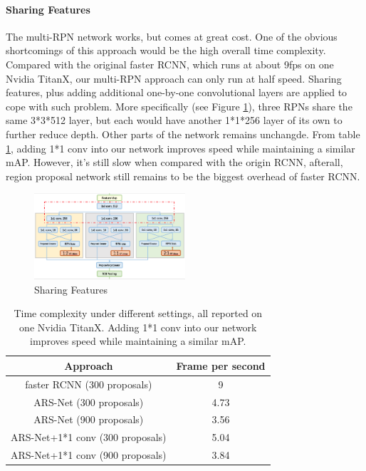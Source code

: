 \documentclass[10pt,twocolumn,letterpaper]{article}
\begin{document}
\paragraph{Sharing Features}
The multi-RPN network works, but comes at great cost. One of the obvious shortcomings of this approach would be the high overall time complexity. Compared with the original faster RCNN, which runs at about 9fps on one Nvidia TitanX, our multi-RPN approach can only run at half speed. Sharing features, plus adding additional one-by-one convolutional layers are applied to cope with such problem. More specifically (see Figure \ref{ARS_sh}), three RPNs share the same 3*3*512 layer, but each would have another 1*1*256 layer of its own to further reduce depth. Other parts of the network remains unchangde. From table \ref{table_fps}, adding 1*1 conv into our network improves speed while maintaining a similar mAP. However, it's still slow when compared with the origin RCNN, afterall, region proposal network still remains to be the biggest overhead of faster RCNN.
    \begin{figure}[!htb]
    \includegraphics[width= 0.5\textwidth]{pic/ARS-archi-share.png}
    \caption{Sharing Features}
    \label{ARS_sh}
    \end{figure}

\begin{table}[ht]
\centering
\begin{tabular}{|c|c|}
\hline Approach & Frame per second \\
\hline faster RCNN (300 proposals) & 9 \\
\hline ARS-Net (300 proposals) & 4.73 \\
\hline ARS-Net (900 proposals) & 3.56 \\
\hline ARS-Net+1*1 conv (300 proposals) & 5.04 \\
\hline ARS-Net+1*1 conv (900 proposals) & 3.84 \\
\hline
\end{tabular}
\caption{Time complexity under different settings, all reported on one Nvidia TitanX. Adding 1*1 conv into our network improves speed while maintaining a similar mAP.}
\label{table_fps}
\end{table}
\end{document}
